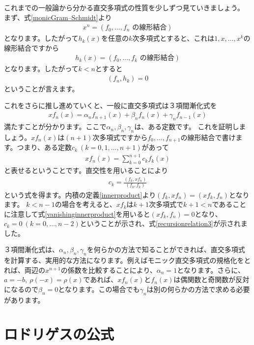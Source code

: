 \documentclass[report,paper=a4, fontsize=12pt, line_length=16cm, number_of_lines=33,dvipdfmx]{jlreq}
\numberwithin{equation}{section}
\begin{document}
これまでの一般論から分かる直交多項式の性質を少しずつ見ていきましょう。
まず、式\eqref{monicGram–Schmidt}より
\begin{align}
  x^n=(f_0,\dots,f_n \text{ の線形結合})
\end{align}
となります。したがって$h_k(x)$を任意の$k$次多項式とすると、これは$1,x,\dots,x^k$の線形結合ですから
\begin{align}
  h_k(x)=(f_0,\dots,f_k \text{ の線形結合})
\end{align}
となります。したがって$k<n$とすると
\begin{align}
  (f_n,h_k)=0\label{vanishinginnerproduct}
\end{align}
ということが言えます。

これをさらに推し進めていくと、一般に直交多項式は３項間漸化式を
\begin{align}
  xf_n(x)=\alpha_n f_{n+1}(x)+\beta_n f_n(x)+\gamma_n f_{n-1}(x)
  \label{recursionrelation3}
\end{align}
満たすことが分かります。ここで$\alpha_n,\beta_n,\gamma_n$は、ある定数です。
これを証明しましょう。$xf_n(x)$は$(n+1)$次多項式ですから$f_0,\dots,f_{n+1}$の線形結合で書けます。つまり、ある定数$c_{k}\ (k=0,1,\dots,n+1)$があって
\begin{align}
  xf_n(x)=\sum_{k=0}^{n+1}c_{k}f_{k}(x)
\end{align}
と表せるということです。直交性を用いることにより
\begin{align}
  c_k=\frac{(f_k,xf_n)}{(f_k,f_k)}
\end{align}
という式を得ます。内積の定義\eqref{innerproduct}より$(f_k,xf_n)=(xf_k,f_n)$となります。
$k<n-1$の場合を考えると、$xf_k$は$k+1$次多項式で$k+1<n$であることに注意して式\eqref{vanishinginnerproduct}を用いると$(xf_k,f_n)=0$となり、$c_k=0\ (k=0,\dots, n-2)$ということが示され、式\eqref{recursionrelation3}が示されました。

３項間漸化式は、$\alpha_n,\beta_n,\gamma_n$を何らかの方法で知ることができれば、直交多項式を計算する、実用的な方法になります。例えばモニック直交多項式の規格化をとれば、両辺の$x^{n+1}$の係数を比較することにより、$\alpha_n=1$となります。さらに、$a=-b,\ \rho(-x)=\rho(x)$であれば、$xf_n(x)$と$f_n(x)$は偶関数と奇関数が反対になるので$\beta_n=0$となります。この場合でも$\gamma_n$は別の何らかの方法で求める必要があります。

\section{ロドリゲスの公式}
\end{document}
